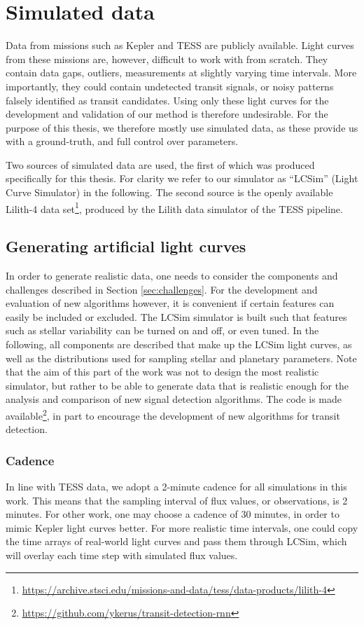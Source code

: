 
\section{Simulated data}
Data from missions such as Kepler and TESS are publicly available. Light curves from these missions are, however, difficult to work with from scratch. They contain data gaps, outliers, measurements at slightly varying time intervals. More importantly, they could contain undetected transit signals, or noisy patterns falsely identified as transit candidates. Using only these light curves for the development and validation of our method is therefore undesirable. For the purpose of this thesis, we therefore mostly use simulated data, as these provide us with a ground-truth, and full control over parameters. 

Two sources of simulated data are used, the first of which was produced specifically for this thesis. For clarity we refer to our simulator as ``LCSim'' (Light Curve Simulator) in the following. The second source is the openly available Lilith-4 data set\footnote{\url{https://archive.stsci.edu/missions-and-data/tess/data-products/lilith-4}}, produced by the Lilith data simulator of the TESS pipeline.

\subsection{Generating artificial light curves}
In order to generate realistic data, one needs to consider the components and challenges described in Section \ref{sec:challenges}. For the development and evaluation of new algorithms however, it is convenient if certain features can easily be included or excluded. The LCSim simulator is built such that features such as stellar variability can be turned on and off, or even tuned. In the following, all components are described that make up the LCSim light curves, as well as the distributions used for sampling stellar and planetary parameters. Note that the aim of this part of the work was not to design the most realistic simulator, but rather to be able to generate data that is realistic enough for the analysis and comparison of new signal detection algorithms. The code is made available\footnote{\url{https://github.com/ykerus/transit-detection-rnn}}, in part to encourage the development of new algorithms for transit detection.

\subsubsection{Cadence}
In line with TESS data, we adopt a 2-minute cadence for all simulations in this work. This means that the sampling interval of flux values, or observations, is 2 minutes. For other work, one may choose a cadence of 30 minutes, in order to mimic Kepler light curves better. For more realistic time intervals, one could copy the time arrays of real-world light curves and pass them through LCSim, which will overlay each time step with simulated flux values.

